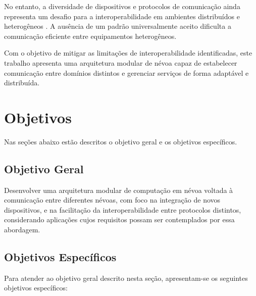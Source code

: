 No entanto, a diversidade de dispositivos e protocolos de comunicação ainda representa um desafio para a interoperabilidade em ambientes distribuídos e heterogêneos \cite{tseng2018,markakis2017}. A ausência de um padrão universalmente aceito dificulta a comunicação eficiente entre equipamentos heterogêneos.

Com o objetivo de mitigar as limitações de interoperabilidade identificadas, este trabalho apresenta uma arquitetura modular de névoa capaz de estabelecer comunicação entre domínios distintos e gerenciar serviços de forma adaptável e distribuída.

\section{Objetivos}

Nas seções abaixo estão descritos o objetivo geral e os objetivos 
específicos.

\subsection{Objetivo Geral}

Desenvolver uma arquitetura modular de computação em névoa voltada à comunicação entre diferentes névoas, com foco na integração de novos dispositivos, e na facilitação da interoperabilidade entre protocolos distintos, considerando aplicações cujos requisitos possam ser contemplados por essa abordagem.

\subsection{Objetivos Específicos}

Para atender ao objetivo geral descrito nesta seção, apresentam-se os seguintes objetivos específicos:

